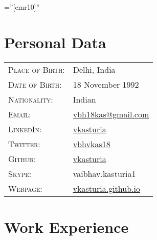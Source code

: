 \documentclass[a4paper,10pt]{article} %
\begin{document}
\pagestyle{empty} %

\font\fb=''[cmr10]'' %


\par{\bigskip\par} %

\section{Personal Data}

\begin{tabular}{ll}
\textsc{Place of Birth:} & Delhi, India \\ 
\textsc{Date of Birth:} & 18 November 1992 \\
\textsc{Nationality:} & Indian\\
\textsc{Email:} & \href{mailto:vbh18kas@gmail.com}{vbh18kas@gmail.com} \\
\textsc{LinkedIn:} & \href{https://www.linkedin.com/in/vkasturia/}{vkasturia} \\
\textsc{Twitter:} & \href{https://twitter.com/vbhvkas18}{vbhvkas18} \\
\textsc{Github:} & \href{https://github.com/vkasturia}{vkasturia} \\
\textsc{Skype:} & vaibhav.kasturia1 \\
\textsc{Webpage:} & \href{https://vkasturia.github.io}{vkasturia.github.io}
\end{tabular}


\section{Work Experience}
\end{document}
